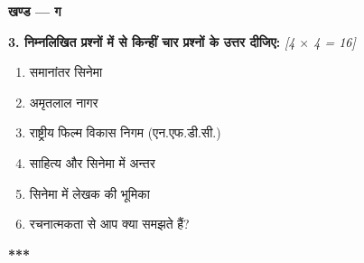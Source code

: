 \documentclass[11pt,a4paper]{article}
\newcommand{\pts}[1]{\hfill \textit{[#1]}}
\begin{document}
\bigskip

\begin{center}
  \textbf{खण्ड --- ग}
\end{center}
\noindent \textbf{3. निम्नलिखित प्रश्नों में से किन्हीं चार प्रश्नों के उत्तर दीजिए:} \pts{4 $\times$ 4 = 16}
\begin{enumerate}[label=(\क)]
  \item समानांतर सिनेमा
  \item अमृतलाल नागर
  \item राष्ट्रीय फिल्म विकास निगम (एन.एफ.डी.सी.)
  \item साहित्य और सिनेमा में अन्तर
  \item सिनेमा में लेखक की भूमिका
  \item रचनात्मकता से आप क्या समझते हैं?
\end{enumerate}

\bigskip
\begin{center}
  \textbf{***}
\end{center}
\end{document}
